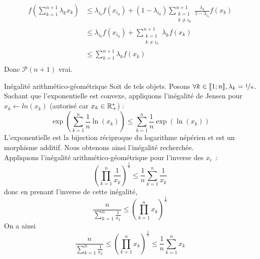 \documentclass{article}
\begin{document}
\begin{question_kholle}
\begin{itemize}[label=$*$, leftmargin=0.5cm]
		      \begin{equation*}
			      \begin{aligned}
				      f\left( \sum_{k=1}^{n+1} \lambda_k x_k \right)
				       & \leqslant \lambda_{i_0} f(x_{i_0}) + \left( 1 - \lambda_{i_0} \right) \sum_{\begin{array}{c} k = 1 \\ k \neq i_0 \end{array}}^{n+1} \frac{\lambda_k}{1 - \lambda_{i_0}} f\left( x_k \right) \\
				       & \leqslant \lambda_{i_0} f(x_{i_0}) + \sum_{\begin{array}{c} k = 1 \\ k \neq i_0 \end{array}}^{n+1} \lambda_k f\left( x_k \right)                                                            \\
				       & \leqslant \sum_{k = 1}^{n+1} \lambda_k f\left( x_k \right)                                                                                                                                  \\
			      \end{aligned}
		      \end{equation*}
		      Donc $\mathcal{P}(n+1)$ vrai.
	\end{itemize}
\end{question_kholle}

\begin{question_kholle}
	[Soit $n \in \N^*$. Soient $(x_{1}, \dots, x_{n}) \in \R_+^{*n}$.
		\begin{equation}
			\left( \prod_{k=1}^{n} x_k \right)^{\nicefrac{1}{n}}
			\leqslant \frac{1}{n} \sum_{k=1}^{n} x_k
		\end{equation}]
	{Inégalité arithmético-géométrique}
	Soit de tels objets. Posons $\forall k \in [\![1;n]\!], \lambda_k = \nicefrac{1}{n}$. \\
	Sachant que l'exponentielle est convexe, appliquons l'inégalité de Jensen pour $x_k \leftarrow ln(x_k)$ (autorisé car $x_k \in \mathbb R_+^*$) :
	\begin{equation*}
		\exp \left( \sum_{k=1}^{n} \frac{1}{n} \ln \left( x_k \right) \right)
		\leqslant \sum_{k=1}^{n} \frac{1}{n} \exp \left( \ln \left( x_k \right) \right)
	\end{equation*}
	L'exponentielle est la bijection réciproque du logarithme népérien et est un morphisme additif. Nous obtenons ainsi l'inégalité recherchée.\\
	Appliquons l’inégalité arithmético-géométrique pour l’inverse des $x_{i}$~:
	\[
		\left(\prod_{k=1}^{n} \frac{1}{x_{k}}\right)^{\frac{1}{n}} \leq \frac{1}{n} \sum_{k=1}^{n}\frac{1}{x_{k}}
	\]
	donc en prenant l’inverse de cette inégalité,
	\[
		\frac{n}{\displaystyle\sum_{k=1}^{n}\frac{1}{x_{k}}} \leq \left(\prod_{k=1}^{n}x_{k}\right)^{\frac{1}{n}}
	\]
	On a ainsi
	\[
		\frac{n}{\displaystyle\sum_{k=1}^{n}\frac{1}{x_{k}}} \leq \left(\prod_{k=1}^{n}x_{k}\right)^{\frac{1}{n}} \leq \frac{1}{n}\sum_{k=1}^{n}x_{k}
	\]
\end{question_kholle}
\end{document}
